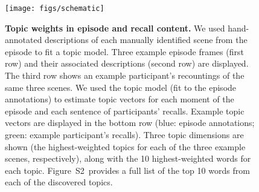 \documentclass[10pt]{article}
\newcommand{\topics}{S2}
\begin{document}
\begin{figure}[tp]
\centering
\texttt{[image: figs/schematic]}
\caption{\small \textbf{Topic weights in episode and recall content.} We used hand-annotated descriptions of each manually identified scene from the episode to fit a topic model.  Three example episode frames (first row) and their associated descriptions (second row) are displayed.  The third row shows an example participant's recountings of the same three scenes.  We used the topic model (fit to the episode annotations) to estimate topic vectors for each moment of the episode and each sentence of participants' recalls.  Example topic vectors are displayed in the bottom row (blue: episode annotations; green: example participant's recalls).  Three topic dimensions are shown (the highest-weighted topics for each of the three example scenes, respectively), along with the 10 highest-weighted words for each topic.  Figure~\topics~provides a full list of the top 10 words from each of the discovered topics.}
\label{fig:schematic}
\end{figure}
\end{document}

